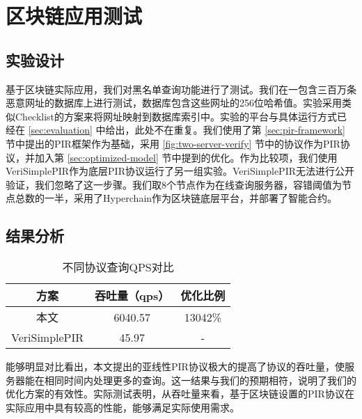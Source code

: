 \section{区块链应用测试}
\subsection{实验设计}
基于区块链实际应用，我们对黑名单查询功能进行了测试。我们在一包含三百万条恶意网址的数据库上进行测试，数据库包含这些网址的256位哈希值。实验采用类似Checklist\cite{Checklist}的方案来将网址映射到数据库索引中。实验的平台与具体运行方式已经在 \ref{sec:evaluation} 中给出，此处不在重复。我们使用了第 \ref{sec:pir-framework} 节中提出的PIR框架作为基础，采用 \ref{fig:two-server-verify} 节中的协议作为PIR协议，并加入第 \ref{sec:optimized-model} 节中提到的优化。作为比较项，我们使用VeriSimplePIR\cite{VeriSimplePIR}作为底层PIR协议运行了另一组实验。VeriSimplePIR无法进行公开验证，我们忽略了这一步骤。我们取8个节点作为在线查询服务器，容错阈值为节点总数的一半，采用了Hyperchain\cite{hyperchain}作为区块链底层平台，并部署了智能合约。

\subsection{结果分析}
\begin{table}[]
    \caption{不同协议查询QPS对比}
    \centering
    \label{tab:blockchain-query-qps}
    \begin{tabular}{@{}c|c|c@{}}
    \toprule
    方案            & 吞吐量（qps） & 优化比例    \\ \midrule
    本文            & 6040.57  & 13042\% \\
    VeriSimplePIR & 45.97    & -       \\ \bottomrule
    \end{tabular}
\end{table}

能够明显对比看出，本文提出的亚线性PIR协议极大的提高了协议的吞吐量，使服务器能在相同时间内处理更多的查询。这一结果与我们的预期相符，说明了我们的优化方案的有效性。实际测试表明，从吞吐量来看，基于区块链设置的PIR协议在实际应用中具有较高的性能，能够满足实际使用需求。